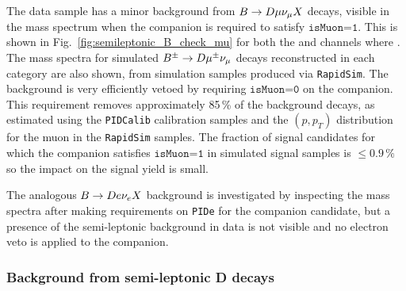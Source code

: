 The data sample has a minor background from ${B}\rightarrow{\ensuremath{D}}\mu\nu_\mu X$ decays, visible in the \B mass spectrum when the companion is required to satisfy $\texttt{isMuon=1}$.  This is shown in Fig.~\ref{fig:semileptonic_B_check_mu} for both the \BtoDK and \BtoDpi channels where \DtoKspipi. The \B mass spectra for simulated ${{B}^\pm}\rightarrow{\ensuremath{D}}{\ensuremath{\mu^\pm}}\nu_\mu$ decays reconstructed in each category are also shown, from simulation samples produced via \texttt{RapidSim}. The background is very efficiently vetoed by requiring $\texttt{isMuon=0}$ on the companion. This requirement removes approximately 85\,\% of the background decays, as estimated using the \texttt{PIDCalib} calibration samples and the $(p, p_T)$ distribution for the muon in the \texttt{RapidSim} samples. The fraction of signal candidates for which the companion satisfies $\texttt{isMuon=1}$ in simulated signal samples is $\leq 0.9\,\%$ so the impact on the signal yield is small.



The analogous ${B}\rightarrow{\ensuremath{D}} e\nu_e X$ background is investigated by inspecting the \B mass spectra after making requirements on \texttt{PIDe} for the companion candidate, but a presence of the semi-leptonic background in data is not visible and no electron veto is applied to the companion.


\subsubsection{Background from semi-leptonic D decays} %
\label{ssub:background_from_semi_leptonic_d_decays}

